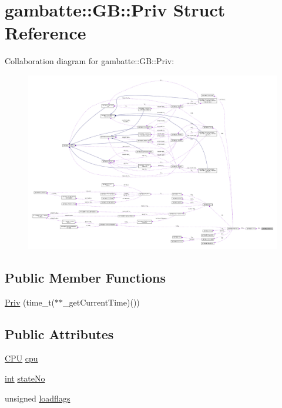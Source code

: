 \hypertarget{structgambatte_1_1GB_1_1Priv}{}\section{gambatte\+:\+:GB\+:\+:Priv Struct Reference}
\label{structgambatte_1_1GB_1_1Priv}


Collaboration diagram for gambatte\+:\+:GB\+:\+:Priv\+:
\nopagebreak
\begin{figure}[H]
\begin{center}
\leavevmode
\includegraphics[width=350pt]{structgambatte_1_1GB_1_1Priv__coll__graph}
\end{center}
\end{figure}
\subsection*{Public Member Functions}
\begin{DoxyCompactItemize}
\item 
\hyperlink{structgambatte_1_1GB_1_1Priv_a2d1cc0005de51b6689fae944b124e4a4}{Priv} (time\+\_\+t($\ast$$\ast$\+\_\+get\+Current\+Time)())
\end{DoxyCompactItemize}
\subsection*{Public Attributes}
\begin{DoxyCompactItemize}
\item 
\hyperlink{classgambatte_1_1CPU}{C\+PU} \hyperlink{structgambatte_1_1GB_1_1Priv_addcc3d5369c9e5a82aedcf915112b168}{cpu}
\item 
\hyperlink{ioapi_8h_a787fa3cf048117ba7123753c1e74fcd6}{int} \hyperlink{structgambatte_1_1GB_1_1Priv_ae942db4bbe5234a0ae60abf44be98357}{state\+No}
\item 
unsigned \hyperlink{structgambatte_1_1GB_1_1Priv_a9d8c9106fc5dcceaf418b53cfbd8e357}{loadflags}
\end{DoxyCompactItemize}


